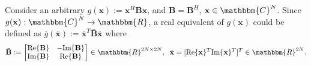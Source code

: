 \documentclass[11pt,draftclsnofoot,onecolumn]{IEEEtran}
\theoremstyle{definition}
\theoremstyle{remark}
\begin{document}
Consider an arbitrary $g(\mathbf{x}):= \mathbf{x}^H\mathbf{Bx}$, and $\mathbf{B}=\mathbf{B}^H$, $\mathbf{x}\in\mathbbm{C}^N$. Since $g(\mathbf{x}):\mathbbm{C}^N\rightarrow\mathbbm{R}$, a real equivalent of $g(\mathbf{x})$ could be defined as $\bar{g}(\bar{\mathbf{x}}):=\bar{\mathbf{x}}^T\bar{\mathbf{B} }\bar{\mathbf{x}}$ where 
\begin{equation*}
\bar{\mathbf{B}}:= \left[ \begin{matrix} \mbox{Re}\{ \mathbf{B} \} & -\mbox{Im} \{\mathbf{B} \}  \\
\mbox{Im} \{\mathbf{B} \} & \mbox{Re}\{ \mathbf{B} \} \end{matrix} \right] \in\mathbbm{R}^{2N\times 2N}, \;\; \bar{\mathbf{x}}=[\mbox{Re} \{ \mathbf{x} \}^T \mbox{Im} \{ \mathbf{x} \}^T ]^T \in \mathbbm{R}^{2N}.
\end{equation*}
\end{document}
